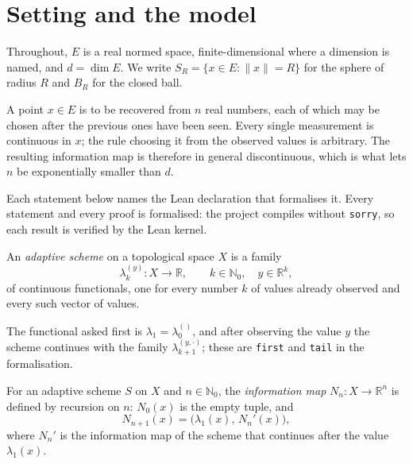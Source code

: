 
\chapter{Setting and the model}
\label{ch:model}

Throughout, $E$ is a real normed space, finite-dimensional where a dimension is
named, and $d = \dim E$. We write $S_R = \{x \in E : \|x\| = R\}$ for the sphere of
radius $R$ and $B_R$ for the closed ball.

A point $x \in E$ is to be recovered from $n$ real numbers, each of which may be
chosen after the previous ones have been seen. Every single measurement is continuous
in $x$; the rule choosing it from the observed values is arbitrary. The resulting
information map is therefore in general discontinuous, which is what lets $n$ be
exponentially smaller than $d$.

Each statement below names the Lean declaration that formalises it. Every statement
and every proof is formalised: the project compiles without \texttt{sorry}, so each
result is verified by the Lean kernel.

\begin{definition}
\label{def:adaptive-scheme}
\leanok
An \emph{adaptive scheme} on a topological space $X$ is a family
\[
  \lambda_k^{(y)} : X \longrightarrow \mathbb{R},
  \qquad k \in \mathbb{N}_0, \quad y \in \mathbb{R}^k,
\]
of continuous functionals, one for every number $k$ of values already observed and
every such vector of values.
\end{definition}

The functional asked first is $\lambda_1 = \lambda_0^{()}$, and after observing the
value $y$ the scheme continues with the family $\lambda_{k+1}^{(y, \cdot)}$; these are
\texttt{first} and \texttt{tail} in the formalisation.

\begin{definition}
\label{def:info}
\leanok
{}
For an adaptive scheme $S$ on $X$ and $n \in \mathbb{N}_0$, the \emph{information map}
$N_n : X \to \mathbb{R}^n$ is defined by recursion on $n$: $N_0(x)$ is the empty
tuple, and
\[
  N_{n+1}(x) = \bigl( \lambda_1(x), \, N_n'(x) \bigr),
\]
where $N_n'$ is the information map of the scheme that continues after the value
$\lambda_1(x)$.
\end{definition}

